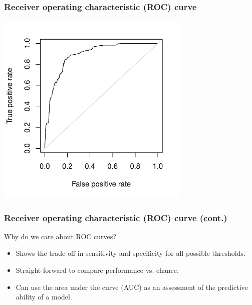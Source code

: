 
\begin{frame}
\frametitle{Receiver operating characteristic (ROC) curve}

\vspace{-8mm}

\begin{center}
\includegraphics[width=0.7\textwidth]{8-4_logistic_reg/figures/spam/ROC.pdf}
\end{center}

\end{frame}


\begin{frame}
\frametitle{Receiver operating characteristic (ROC) curve (cont.)}

Why do we care about ROC curves?

\begin{itemize}
\item Shows the trade off in sensitivity and specificity for all possible thresholds.

\item Straight forward to compare performance vs. chance.

\item Can use the area under the curve (AUC) as an assessment of the predictive ability of a model.

\end{itemize}

\end{frame}


